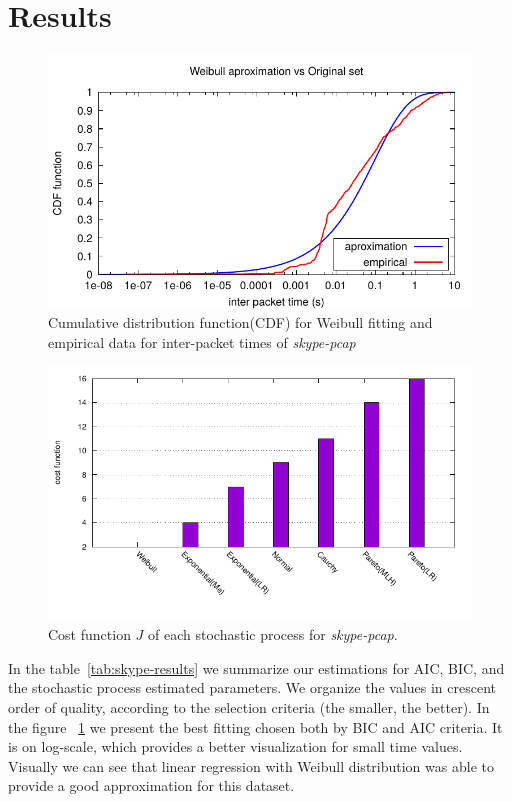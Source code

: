 \section{Results}
\begin{figure}[t]
{\centering
\includegraphics[width=\columnwidth]{figures/Weibull}
\caption{Cumulative distribution function(CDF) for Weibull fitting and empirical data for inter-packet times of \textit{skype-pcap}}
\label{fig:skype-weibull}\par}
\end{figure}
\begin{figure}[b]
{\centering
\includegraphics[width=\columnwidth]{figures/costFunction2}
\caption{Cost function $J$ of each stochastic process for \textit{skype-pcap}.}
\label{fig:cost-function}\par}
\end{figure}
In the table~\ref{tab:skype-results} we summarize our estimations for AIC, BIC, and the stochastic process estimated parameters. We organize the values in crescent order of quality, according to the selection criteria (the smaller, the better). In the figure ~\ref{fig:skype-weibull} we present the best fitting chosen both by BIC and AIC criteria. It is on log-scale, which provides a better visualization for small time values. Visually we can see that linear regression with Weibull distribution was able to provide a good approximation for this dataset.

